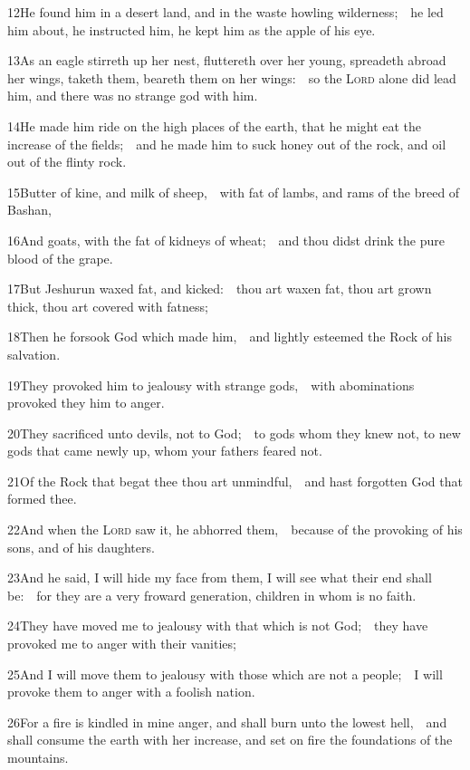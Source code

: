 12\enspace He found him in a desert land, and in the waste howling wilderness;\ \star\ he led him about, he instructed him, he kept him as the apple of his eye.

13\enspace As an eagle stirreth up her nest, fluttereth over her young, spreadeth abroad her wings, taketh them, beareth them on her wings:\ \star\ so the {\scshape Lord} alone did lead him, and there was no strange god with him.

14\enspace He made him ride on the high places of the earth, that he might eat the increase of the fields;\ \star\ and he made him to suck honey out of the rock, and oil out of the flinty rock.

15\enspace Butter of kine, and milk of sheep,\ \star\ with fat of lambs, and rams of the breed of Bashan,

16\enspace And goats, with the fat of kidneys of wheat;\ \star\ and thou didst drink the pure blood of the grape.

17\enspace But Jeshurun waxed fat, and kicked:\ \star\ thou art waxen fat, thou art grown thick, thou art covered with fatness;

18\enspace Then he forsook God which made him,\ \star\ and lightly esteemed the Rock of his salvation.

19\enspace They provoked him to jealousy with strange gods,\ \star\ with abominations provoked they him to anger.

20\enspace They sacrificed unto devils, not to God;\ \star\ to gods whom they knew not, to new gods that came newly up, whom your fathers feared not.

21\enspace Of the Rock that begat thee thou art unmindful,\ \star\ and hast forgotten God that formed thee.

22\enspace And when the {\scshape Lord} saw it, he abhorred them,\ \star\ because of the provoking of his sons, and of his daughters.

23\enspace And he said, I will hide my face from them, I will see what their end shall be:\ \star\ for they are a very froward generation, children in whom is no faith.

24\enspace They have moved me to jealousy with that which is not God;\ \star\ they have provoked me to anger with their vanities;

25\enspace And I will move them to jealousy with those which are not a people;\ \star\ I will provoke them to anger with a foolish nation.

26\enspace For a fire is kindled in mine anger, and shall burn unto the lowest hell,\ \star\ and shall consume the earth with her increase, and set on fire the foundations of the mountains.

